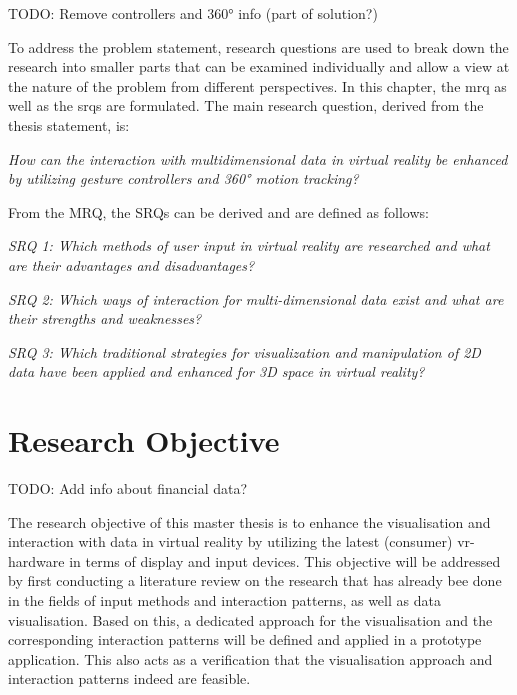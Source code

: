 TODO: Remove controllers and 360° info (part of solution?)

To address the problem statement, research questions are used to break down the research into smaller parts that can be examined individually and allow a view at the nature of the problem from different perspectives.
In this chapter, the \gls{mrq} as well as the \glspl{srq} are formulated. \newline
The main research question, derived from the thesis statement, is:
\begin{framed}
	\textit{How can the interaction with multidimensional data in virtual reality be enhanced by utilizing gesture controllers and 360° motion tracking?}
\end{framed} \label{MRQ}
From the MRQ, the SRQs can be derived and are defined as follows:
\begin{framed}
	\textit{SRQ 1: Which methods of user input in virtual reality are researched and what are their advantages and disadvantages?}
\end{framed} \label{SRQ1}
\begin{framed}
	\textit{SRQ 2: Which ways of interaction for multi-dimensional data exist and what are their strengths and weaknesses?}
\end{framed} \label{SRQ2}
\begin{framed}
	\textit{SRQ 3: Which traditional strategies for visualization and manipulation of 2D data have been applied and enhanced for 3D space in virtual reality?}
\end{framed} \label{SRQ3}
 


\section{Research Objective}

TODO: Add info about financial data?

The research objective of this master thesis is to enhance the visualisation and interaction with data in virtual reality by utilizing the latest (consumer) \gls{vr}-hardware in terms of display and input devices. \newline
This objective will be addressed by first conducting a literature review on the research that has already bee done in the fields of input methods and interaction patterns, as well as data visualisation. Based on this, a dedicated approach for the visualisation and the corresponding interaction patterns will be defined and applied in a prototype application. This also acts as a verification that the visualisation approach and interaction patterns indeed are feasible.



